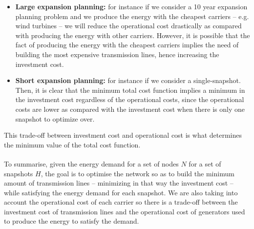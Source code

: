 \begin{itemize}
    \item \textbf{Large expansion planning:} for instance if we consider a 10 year expansion planning problem and we produce the energy with the cheapest carriers -- e.g. wind turbines -- we will reduce the operational cost drastically as compared with producing the energy with other carriers. However, it is possible that the fact of producing the energy with the cheapest carriers implies the need of building the most expensive transmission lines, hence increasing the investment cost.
    \item \textbf{Short expansion planning:} for instance if we consider a single-snapshot.  Then, it is clear that the minimum total cost function implies a minimum in the investment cost regardless of the operational costs, since the operational costs are lower as compared with the investment cost when there is only one snapshot to optimize over.
\end{itemize}
This trade-off between investment cost and operational cost is what determines the minimum value of the total cost function.\\\\
To summarise, given the energy demand for a set of nodes $N$ for a set of snapshots $H$, the goal is to optimise the network so as to build the minimum amount of transmission lines -- minimizing in that way the investment cost -- while satisfying the energy demand for each snapshot. We are also taking into account the operational cost of each carrier so there is a trade-off between the investment cost of transmission lines and the operational cost of generators used to produce the energy to satisfy the demand.
